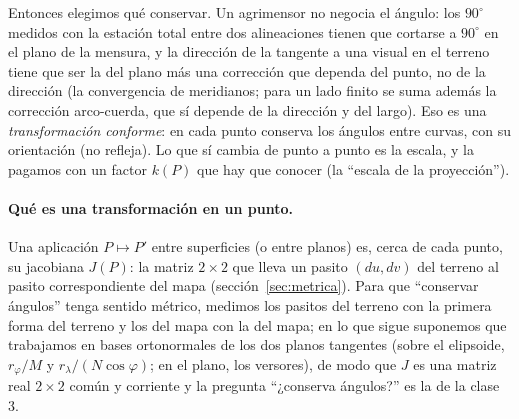 Entonces elegimos qué conservar. Un agrimensor no negocia el ángulo: los \(90^\circ\)
medidos con la estación total entre dos alineaciones tienen que cortarse a \(90^\circ\) en
el plano de la mensura, y la dirección de la tangente a una visual en el terreno tiene
que ser la del plano más una corrección que dependa del punto, no de la dirección (la
convergencia de meridianos; para un lado finito se suma además la corrección
arco-cuerda, que sí depende de la dirección y del largo). Eso es una
\emph{transformación conforme}: en cada punto conserva los ángulos entre curvas, con su
orientación (no refleja). Lo que sí cambia de punto a punto es la escala, y la pagamos con
un factor \(k(P)\) que hay que conocer (la ``escala de la proyección'').

\paragraph{Qué es una transformación en un punto.} Una aplicación \(P\mapsto P'\) entre
superficies (o entre planos) es, cerca de cada punto, su jacobiana \(J(P)\): la matriz
\(2\times2\) que lleva un pasito \((du,dv)\) del terreno al pasito correspondiente del mapa
(sección~\ref{sec:metrica}). Para que ``conservar ángulos'' tenga sentido métrico, medimos
los pasitos del terreno con la primera forma del terreno y los del mapa con la del mapa; en
lo que sigue suponemos que trabajamos en bases ortonormales de los dos planos tangentes
(sobre el elipsoide, \(r_\varphi/M\) y \(r_\lambda/(N\cos\varphi)\); en el plano, los
versores), de modo que \(J\) es una matriz real \(2\times2\) común y corriente y la
pregunta ``¿conserva ángulos?'' es la de la clase 3.


